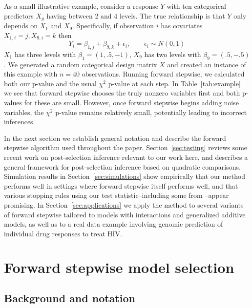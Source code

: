 \documentclass{imsart}
\begin{document}
As a small illustrative example, consider a response $Y$ with ten
categorical predictors $X_g$ having between 2 and 4 levels. The true 
relationship is that $Y$ only depends on $X_1$ and $X_9$. Specifically,
if observation $i$ has covariates $X_{1,i} = j, X_{9,i} = k$ then
\[
    Y_i = \beta_{1,j} + \beta_{9,k} + \epsilon_i , \qquad
    \epsilon_i \sim N(0,1)
\]
$X_1$ has three levels with $\beta_1 = (1, .5, -1)$, $X_9$
has two levels with $\beta_9 = (.5, -.5)$. We generated a random
categorical design matrix $X$ and created an instance of this example
with $n = 40$ observations. Running forward stepwise, we calculated
both our p-value and the usual $\chi^2$ p-value at each step. In
Table~\ref{tab:example} we see that forward stepwise chooses the
truly nonzero variables first and both p-values for these are small.
However, once forward stepwise begins adding noise variables, the
$\chi^2$ p-value remains relatively small, potentially leading to 
incorrect inferences.




In the next section we establish general notation and describe the
forward stepwise algorithm used throughout the paper.
Section~\ref{sec:testing} reviews some recent work on
post-selection inference
\citep{significance:lasso,tests:adaptive,lasso:fixed}
relevant to our work here, and describes a general framework
for post-selection inference based on quadratic comparisons.
Simulation results in Section~\ref{sec:simulations} show
empirically that our method performs well in settings where forward
stepwise itself performs well, and that
various stopping rules using our test statistic--including
some from \cite{sequential:fdr}--appear promising. In
Section~\ref{sec:applications} we apply
the method to several variants of forward
stepwise tailored to models with interactions and generalized additive
models, as well as to a real data example involving genomic prediction
of individual drug responses to treat HIV.


\section{Forward stepwise model selection}
\label{sec:stepwise}

\subsection{Background and notation}
\end{document}
